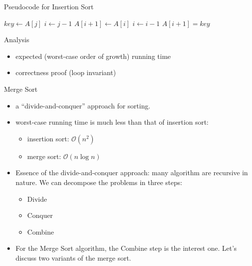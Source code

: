 \documentclass{beamer}
\begin{document}
\begin{frame}
  \begin{block}{Pseudocode for Insertion Sort}
  \begin{algorithmic}
         \State $key \gets A[j]$
         \State $i \gets j-1$
            \State $A[i+1] \gets A[i]$
            \State $i \gets i - 1$        
         \EndWhile
         \State $A[i+1] = key$  
       \EndFor
    \EndProcedure
  \end{algorithmic}  
  \end{block}

  \pause 

  \begin{block}{Analysis}
    \begin{itemize}
      \item expected (worst-case order of growth) running time
      \item correctness proof (loop invariant) 
    \end{itemize}


  \end{block}

\end{frame}

\begin{frame}{Merge Sort}

    \begin{itemize}
      \item a ``divide-and-conquer'' approach for sorting.
      \item worst-case running time is much less than that of insertion sort\pause:
        \begin{itemize}
         \item insertion sort: $\mathcal{O}(n^2)$ 
         \item merge sort: $\mathcal{O}(n\log{}n)$ 
        \end{itemize}
      \item Essence of the divide-and-conquer approach: many algorithm are {\color{blue}recursive} in nature. \pause
        We can decompose the problems in three steps:
        \begin{itemize}
         \item Divide
         \item Conquer
         \item Combine  
        \end{itemize}
        \pause
      \item For the Merge Sort algorithm, the {\color{blue}Combine} step is the interest one. \pause Let's discuss
        two variants of the merge sort. 
    \end{itemize}
\end{frame}
\end{document}
